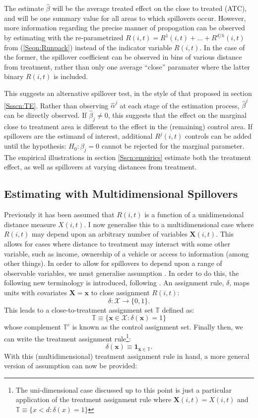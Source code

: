 The estimate $\hat\beta$ will be the average treated effect on the close to 
treated (ATC), and will be one summary value for all areas to which spillovers 
occur. However, more information regarding the precise manner of propogation can 
be observed by estimating with the re-parametrized $R(i,t)=R^1(i,t)+\ldots+
R^{d/h}(i,t)$ from (\ref{Seqn:Runpack}) instead of the indicator variable 
$R(i,t)$.  In the case of the former, the spillover coefficient can be observed
in bins of various distance from treatment, rather than only one average 
``close'' paramater where the latter binary $R(i,t)$ is included. 

This suggests an alternative spillover test, in the style of that proposed in 
section \ref{Ssscn:TE}.  Rather than observing $\hat\alpha^j$ at each stage of 
the estimation process, $\hat\beta^j$ can be directly observed. If 
$\hat\beta_j\neq 0$, this suggests that the effect on the marginal close to 
treatment area is different to the effect in the (remaining) control area. If 
spillovers are the estimand of interest, additional $R^j(i,t)$ controls can be 
added until the hypothesis: $H_0: \beta_j = 0$ cannot be rejected for the 
marginal parameter. The empirical illustrations in section \ref{Sscn:empirics} 
estimate both the treatment effect, as well as spillovers at varying distances 
from treatment.

\subsection{Estimating with Multidimensional Spillovers}
\label{Ssscn:multi}
Previously it has been assumed that $R(i,t)$ is a function of a unidimensional 
distance measure $X(i,t)$. I now generalise this to a multidimensional case 
where $R(i,t)$ may depend upon an arbitrary number of variables 
$\mathbf{X}(i,t)$. This allows for cases where distance to treatment may 
interact with some other variable, such as income, ownership of a vehicle or
access to information (among other things). In order to allow for spillovers to 
depend upon a range of observable variables, we must generalise assumption 
.  In order to do this, the following new terminology is 
introduced, following \citet{Zajonc2012}. An assignment rule, $\delta$, maps 
units with covariates $\mathbf{X=x}$ to close assignment $R(i,t)$:
\[
\delta: \mathcal{X} \rightarrow \{0,1\}.
\]
This leads to a close-to-treatment assignment set $\mathbb{T}$ defined as:
\[
\mathbb{T}\equiv \{ \mathbf{x}\in\mathcal{X}: \delta(\mathbf{x})=1 \}
\]
whose complement $\mathbb{T}^c$ is known as the control assignment
set. Finally then, we can write the treatment assignment rule\footnote{The
uni-dimensional case discussed up to this point is just a particular application
of the treatment assignment rule where $\mathbf{X}(i,t)=X(i,t)$ and 
$\mathbb{T}\equiv \{ x<d: \delta(x)=1 \}$}:
\begin{equation}
\delta(\mathbf{x})\equiv \mathbf{1}_{\mathbf{x}\in\mathbb{T}}.
\end{equation}
With this (multidimensional) treatment assignment rule in hand, a more general 
version of assumption  can now be provided:

